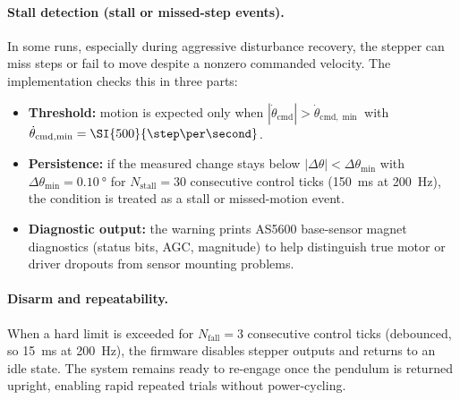 \paragraph{Stall detection (stall or missed-step events).}
In some runs, especially during aggressive disturbance recovery, the stepper can miss steps or fail to move despite a nonzero commanded velocity. The implementation checks this in three parts:
\begin{itemize}
  \item \textbf{Threshold:} motion is expected only when $|\dot{\theta}_{\mathrm{cmd}}|>\dot{\theta}_{\mathrm{cmd},\min}$ with $\dot{\theta}_{\mathrm{cmd},\min}=\SI{500}{\step\per\second}$.
  \item \textbf{Persistence:} if the measured change stays below $|\Delta\theta|<\Delta\theta_{\min}$ with $\Delta\theta_{\min}=\SI{0.10}{\degree}$ for $N_{\mathrm{stall}}=30$ consecutive control ticks (\SI{150}{ms} at \SI{200}{Hz}), the condition is treated as a stall or missed-motion event.
  \item \textbf{Diagnostic output:} the warning prints AS5600 base-sensor magnet diagnostics (status bits, AGC, magnitude) to help distinguish true motor or driver dropouts from sensor mounting problems.
\end{itemize}

\paragraph{Disarm and repeatability.}
When a hard limit is exceeded for $N_{\mathrm{fall}}=3$ consecutive control ticks (debounced, so \SI{15}{ms} at \SI{200}{Hz}), the firmware disables stepper outputs and returns to an idle state. The system remains ready to re-engage once the pendulum is returned upright, enabling rapid repeated trials without power-cycling.

